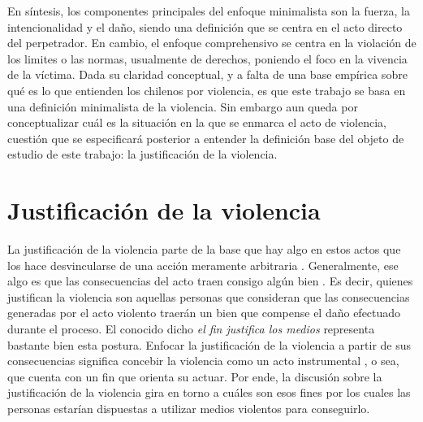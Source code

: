 \documentclass[12pt,twoside]{templates/facsothesis}
\begin{document}
En síntesis, los componentes principales del enfoque minimalista son la fuerza, la intencionalidad y el daño, siendo una definición que se centra en el acto directo del perpetrador. En cambio, el enfoque comprehensivo se centra en la violación de los limites o las normas, usualmente de derechos, poniendo el foco en la vivencia de la víctima. Dada su claridad conceptual, y a falta de una base empírica sobre qué es lo que entienden los chilenos por violencia, es que este trabajo se basa en una definición minimalista de la violencia. Sin embargo aun queda por conceptualizar cuál es la situación en la que se enmarca el acto de violencia, cuestión que se especificará posterior a entender la definición base del objeto de estudio de este trabajo: la justificación de la violencia.

\hypertarget{justificaciuxf3n-de-la-violencia}{%
\section{Justificación de la violencia}\label{justificaciuxf3n-de-la-violencia}}

La justificación de la violencia parte de la base que hay algo en estos actos que los hace desvincularse de una acción meramente arbitraria \citep{Basaure2020}. Generalmente, ese algo es que las consecuencias del acto traen consigo algún bien \citep{Frazer2019}. Es decir, quienes justifican la violencia son aquellas personas que consideran que las consecuencias generadas por el acto violento traerán un bien que compense el daño efectuado durante el proceso. El conocido dicho \emph{el fin justifica los medios} representa bastante bien esta postura. Enfocar la justificación de la violencia a partir de sus consecuencias significa concebir la violencia como un acto instrumental \citep{Blumenthal1972, Arendt2005}, o sea, que cuenta con un fin que orienta su actuar. Por ende, la discusión sobre la justificación de la violencia gira en torno a cuáles son esos fines por los cuales las personas estarían dispuestas a utilizar medios violentos para conseguirlo.
\end{document}
